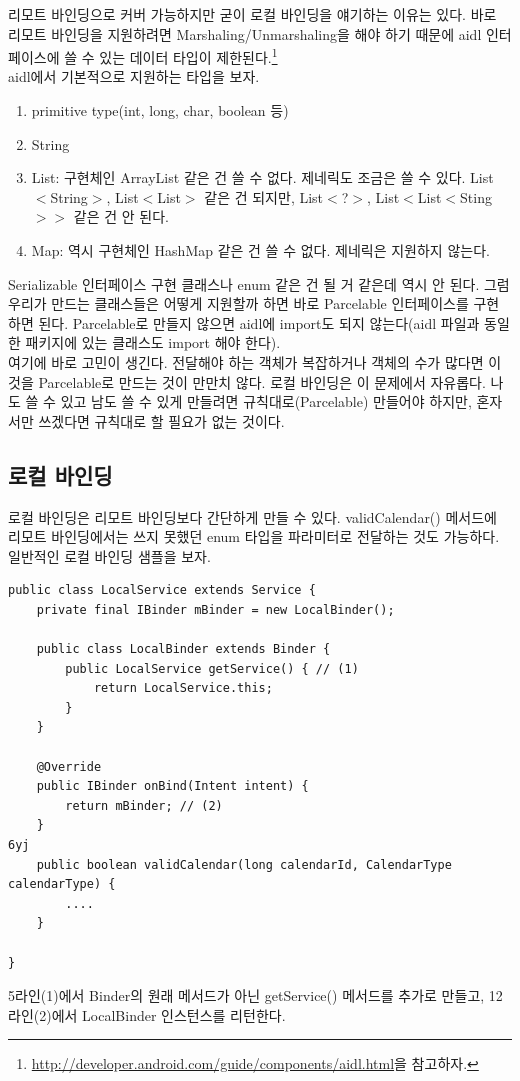 리모트 바인딩으로 커버 가능하지만 굳이 로컬 바인딩을 얘기하는 이유는 있다. 바로 리모트 바인딩을 지원하려면 Marshaling/Unmarshaling을 해야 하기 때문에 
aidl 인터페이스에 쓸 수 있는 데이터 타입이 제한된다.\footnote{\url{http://developer.android.com/guide/components/aidl.html}을 참고하자.}\\

aidl에서 기본적으로 지원하는 타입을 보자. 
\begin{enumerate}
\item primitive type(int, long, char, boolean 등)
\item String
\item List: 구현체인 ArrayList 같은 건 쓸 수 없다. 제네릭도 조금은 쓸 수 있다. List$<$String$>$, List$<$List$>$ 같은 건 되지만, List$<$?$>$, List$<$List$<$Sting$>>$ 같은 건 안 된다.
\item Map: 역시 구현체인 HashMap 같은 건 쓸 수 없다. 제네릭은 지원하지 않는다.
\end{enumerate}
Serializable 인터페이스 구현 클래스나 enum 같은 건 될 거 같은데 역시 안 된다.
그럼 우리가 만드는 클래스들은 어떻게 지원할까 하면 바로 Parcelable 인터페이스를 구현하면 된다. 
Parcelable로 만들지 않으면 aidl에 import도 되지 않는다(aidl 파일과 동일한 패키지에 있는 클래스도 import 해야 한다).\\

여기에 바로 고민이 생긴다. 전달해야 하는 객체가 복잡하거나 객체의 수가 많다면 이것을 Parcelable로 만드는 것이 만만치 않다.
로컬 바인딩은 이 문제에서 자유롭다. 나도 쓸 수 있고 남도 쓸 수 있게 만들려면 규칙대로(Parcelable) 만들어야 하지만, 혼자서만 쓰겠다면 규칙대로 할 필요가 없는 것이다.\\

\subsection{로컬 바인딩}
로컬 바인딩은 리모트 바인딩보다 간단하게 만들 수 있다.
validCalendar() 메서드에 리모트 바인딩에서는 쓰지 못했던 enum 타입을 파라미터로 전달하는 것도 가능하다. 일반적인 로컬 바인딩 샘플을 보자.
\begin{lstlisting}[frame=single]
public class LocalService extends Service {
	private final IBinder mBinder = new LocalBinder();

	public class LocalBinder extends Binder {
		public LocalService getService() { // (1)
			return LocalService.this;
		}
	}

	@Override
	public IBinder onBind(Intent intent) {
		return mBinder; // (2)
	}
6yj
	public boolean validCalendar(long calendarId, CalendarType calendarType) {
		....
	}

}
\end{lstlisting}
5라인(1)에서 Binder의 원래 메서드가 아닌 getService() 메서드를 추가로 만들고, 12라인(2)에서 LocalBinder 인스턴스를 리턴한다.\\

